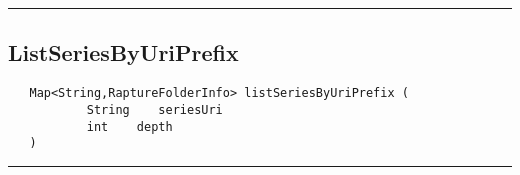 \rule{15cm}{2pt}
\subsection{ListSeriesByUriPrefix}
\label{Api:ListSeriesByUriPrefix}
\begin{verbatim}
   Map<String,RaptureFolderInfo> listSeriesByUriPrefix (
           String    seriesUri
           int    depth
   )
\end{verbatim}



\rule{15cm}{2pt}

